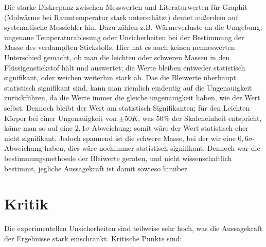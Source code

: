 Die starke Diskrepanz zwischen Messwerten und Literaturwerten für Graphit (Molwärme bei Raumtemperatur stark unterschätzt) deutet außerdem auf systematische Messfehler hin. Dazu zählen z.B. Wärmeverluste an die Umgebung, ungenaue Temperaturablesung oder Unsicherheiten bei der Bestimmung der Masse des verdampften Stickstoffs.
Hier hat es auch keinen nenneswerten Unterschied gemacht, ob man die leichten oder schweren Massen in den Flüssigenstickstof hält und auswertet; die Werte bleiben entweder statistisch signifikant, oder weichen weiterhin stark ab.
Das die Bleiwerte überhaupt statistisch signifikant sind, kann man ziemlich eindeutig auf die Ungenauigkeit zurückführen, da die Werte immer die gleiche ungenauigkeit haben, wie der Wert selbst. 
Dennoch bleibt der Wert am statistisch Signifikanten; für den Leichten Körper bei einer Ungenauigkeit von $\pm 50K$, was $50\%$ der Skaleneinheit entspricht,
käme man so auf eine $2,1\sigma$-Abweichung; somit wäre der Wert statistisch eher nicht signifikant. Jedoch spannend ist die schwere Masse, bei der wir eine $0,6\sigma$-Abweichung haben, dies wäre nochimmer statistisch signifikant.
Dennoch war die bestimmungsmethoede der Bleiwerte geraten, und nicht wissenschaftlich bestimmt, jegliche Aussagekraft ist damit sowieso hinüber.

\section{Kritik}  
Die experimentellen Unsicherheiten sind teilweise sehr hoch, was die Aussagekraft der Ergebnisse stark einschränkt. Kritische Punkte sind:  

